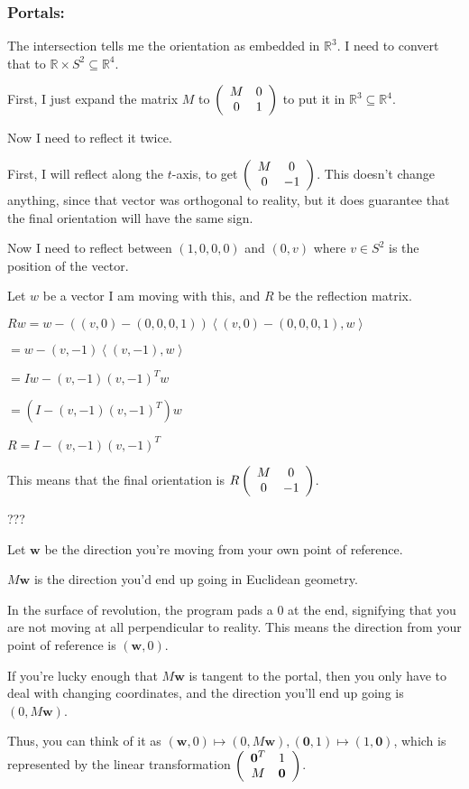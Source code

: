 \bigskip

\subsubsection{Portals:}

The intersection tells me the orientation as embedded in $\mathbb{R}^3$. I need to convert that to $\mathbb{R} \times S^2 \subseteq \mathbb{R}^4$.

First, I just expand the matrix $M$ to $\left(\begin{array}{ccc} M & 0 \\0 & 1 \end{array} \right)$ to put it in $\mathbb{R}^3 \subseteq \mathbb{R}^4$.

Now I need to reflect it twice.

First, I will reflect along the $t$-axis, to get $\left(\begin{array}{ccc} M & 0 \\0 & -1 \end{array} \right)$. This doesn't change anything, since that vector was orthogonal to reality, but it does guarantee that the final orientation will have the same sign.

Now I need to reflect between $(1,0,0,0)$ and $(0,v)$ where $v \in S^2$ is the position of the vector.

Let $w$ be a vector I am moving with this, and $R$ be the reflection matrix.

$Rw = w - ((v,0)-(0,0,0,1))\left<(v,0)-(0,0,0,1),w\right>$

$= w - (v,-1)\left<(v,-1),w\right>$

$= Iw - (v,-1)(v,-1)^Tw$

$= (I - (v,-1)(v,-1)^T)w$

$R = I - (v,-1)(v,-1)^T$

This means that the final orientation is $R\left(\begin{array}{ccc} M & 0 \\0 & -1 \end{array} \right)$.

???

Let $\textbf{w}$ be the direction you're moving from your own point of reference.

$M\textbf{w}$ is the direction you'd end up going in Euclidean geometry.

In the surface of revolution, the program pads a $0$ at the end, signifying that you are not moving at all perpendicular to reality. This means the direction from your point of reference is $(\textbf{w},0)$.

If you're lucky enough that $M\textbf{w}$ is tangent to the portal, then you only have to deal with changing coordinates, and the direction you'll end up going is $(0,M\textbf{w})$.

Thus, you can think of it as $(\textbf{w},0) \mapsto (0,M\textbf{w}), (\textbf{0},1) \mapsto (1,\textbf{0})$, which is represented by the linear transformation $\left(\begin{array}{ccc} \textbf{0}^T & 1 \\M & \textbf{0} \end{array} \right)$.


